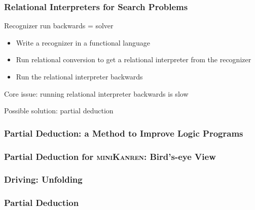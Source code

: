 \documentclass[xcolor=table]{beamer}
\newcommand{\mk}{\textsc{miniKanren}\xspace}
\begin{document}
\begin{frame}[fragile]
  \frametitle{Relational Interpreters for Search Problems}
  \begin{center}
    Recognizer run backwards = solver
  \end{center}

  \begin{itemize}
    \item Write a recognizer in a functional language
    \item Run relational conversion to get a relational interpreter from the recognizer
    \item Run the relational interpreter backwards
  \end{itemize}

\begin{center}
  Core issue: running relational interpreter backwards is slow
\end{center}

\begin{center}
  Possible solution: partial deduction
\end{center}
\end{frame}


\begin{frame}[fragile]
  \frametitle{Partial Deduction: a Method to Improve Logic Programs}
\begin{center}
  
\end{center}
\end{frame}

\begin{frame}[fragile]
  \frametitle{Partial Deduction for \mk: Bird's-eye View}
  \begin{center}

  \end{center}
\end{frame}

\begin{frame}[fragile]
  \frametitle{Driving: Unfolding}
  \begin{center}
    
  \end{center}
\end{frame}

\begin{frame}[fragile]
  \frametitle{Partial Deduction}

\begin{center}
  
\end{center}

\end{frame}
\end{document}
